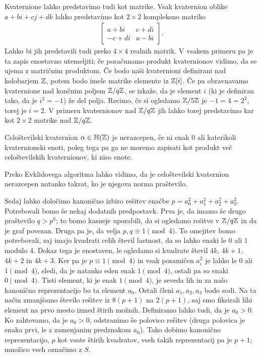 Kvaternione lahko predstavimo tudi kot matrike. Vsak kvaternion oblike \(a + bi + cj + dk\) lahko predstavimo kot \(2\times 2\) kompleksno matriko
\begin{align*}
    \begin{bmatrix}
        a+bi  & c+di \\
        -c+di & a-bi
    \end{bmatrix}.
\end{align*}
Lahko bi jih predstavili tudi preko \(4\times 4\) realnih matrik. V vsakem primeru pa je ta zapis enostavno utemeljiti; če poračunamo produkt kvaternionov vidimo, da se ujema z matričnim produktom. Če bodo naši kvaternioni definirani nad kolobarjem \(\mathbb Z\), potem bodo imele matrike elemente iz \(\mathbb Z[i]\). Če pa obravnavamo kvaternione nad končnim poljem \(\mathbb Z/q\mathbb Z\), se izkaže, da je element \(i\) (ki je definiran tako, da je \(i^2 = -1\)) že del polja. Recimo, če si ogledamo \(\mathbb Z/5\mathbb Z\) je \(-1 = 4 = 2^2\), torej je \(i=2\). V primeru kvaternionov nad \(\mathbb Z/q\mathbb Z\) jih lahko torej predstavimo kar kot \(2\times 2\) matrike nad \(\mathbb Z/q\mathbb Z\).

\begin{definicija}
    Celoštevilski kvaternion \(\alpha\in \mathbb H(\mathbb Z)\) je nerazcepen, če ni enak \(0\) ali katerikoli kvaternionski enoti, poleg tega pa ga ne moremo zapisati kot produkt več celoštevilskih kvaternionov, ki niso enote.
\end{definicija}
Preko Evklidovega algoritma lahko vidimo, da je celoštevilski kvaternion nerazcepen natanko takrat, ko je njegova norma praštevilo. 

Sedaj lahko določimo kanonično izbiro rešitev enačbe \(p=a_0^2 + a_1^2 + a_2^2 + a_3^2\). Potrebovali bomo še nekaj dodatnih predpostavk. Prva je, da imamo še drugo praštevilo \(q>p^8\); to bomo kasneje uporabili, da si ogledamo rešitve v \(\mathbb Z/q\mathbb Z\) in da je graf povezan. Druga pa je, da velja \(p,q \equiv 1 \pmod 4\). To omejitev bomo potrebovali, saj imajo kvadrati celih števil lastnost, da so lahko enaki le \(0\) ali \(1\) modulo 4. Dokaz tega je enostaven, le ogledamo si kvadrate števil \(4k\), \(4k+1\), \(4k+2\) in \(4k+3\). Ker pa je \(p\equiv 1 \pmod 4\) in vsak posamičen \(a_i^2\) je lahko le \(0\) ali \(1\pmod 4\), sledi, da je natanko eden enak \(1\pmod4\), ostali pa so enaki \(0\pmod 4\). Tisti element, ki je enak \(1\pmod4\), je seveda lih in za našo kanonično reprezentacijo bo ta element \(a_0\). Ostali členi \(a_1, a_2, a_3\) bodo sodi. Na ta način zmanjšamo število rešitev iz \(8(p+1)\) na \(2(p+1)\), saj smo fiksirali lihi element na prvo mesto izmed štirih možnih. Definiramo lahko tudi, da je \(a_0>0\). Ko zahtevamo, da je \(a_0>0\), odstranimo še polovico rešitev (druga polovica je enaka prvi, le z zamenjanim predznakom \(a_0\)). Tako dobimo kanonično reprezentacijo, \(p\) kot vsote štirih kvadratov, vseh takih reprezentacij pa je \(p+1\); množico vseh označimo z \(S\).

